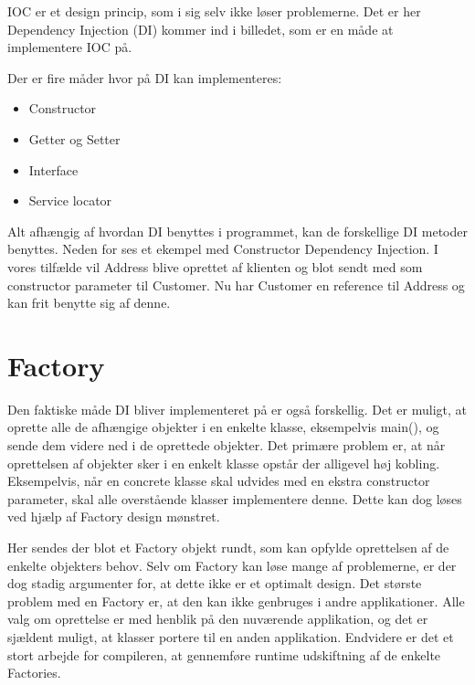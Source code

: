IOC er et design princip, som i sig selv ikke løser problemerne. Det er her Dependency Injection (DI) kommer ind i billedet, som er en måde at implementere IOC på. 

\FloatBarrier

Der er fire måder hvor på DI kan implementeres: 

\begin{itemize}
	\item Constructor
	\item Getter og Setter
	\item Interface
	\item Service locator
\end{itemize}

Alt afhængig af hvordan DI benyttes i programmet, kan de forskellige DI metoder benyttes. Neden for ses et ekempel med Constructor Dependency Injection. I vores tilfælde vil Address blive oprettet af klienten og blot sendt med som constructor parameter til Customer. Nu har Customer en reference til Address og kan frit benytte sig af denne.


\section{Factory}

Den faktiske måde DI bliver implementeret på er også forskellig. Det er muligt, at oprette alle de afhængige objekter i en enkelte klasse, eksempelvis main(), og sende dem videre ned i de oprettede objekter. Det primære problem er, at når oprettelsen af objekter sker i en enkelt klasse opstår der alligevel høj kobling. Eksempelvis, når en concrete klasse skal udvides med en ekstra constructor parameter, skal alle overstående klasser implementere denne. Dette kan dog løses ved hjælp af Factory design mønstret. 


Her sendes der blot et Factory objekt rundt, som kan opfylde oprettelsen af de enkelte objekters behov. Selv om Factory kan løse mange af problemerne, er der dog stadig argumenter for, at dette ikke er et optimalt design. Det største problem med en Factory er, at den kan ikke genbruges i andre applikationer. Alle valg om oprettelse er med henblik på den nuværende applikation, og det er sjældent muligt, at klasser portere til en anden applikation. Endvidere er det et stort arbejde for compileren, at gennemføre runtime udskiftning af de enkelte Factories.


